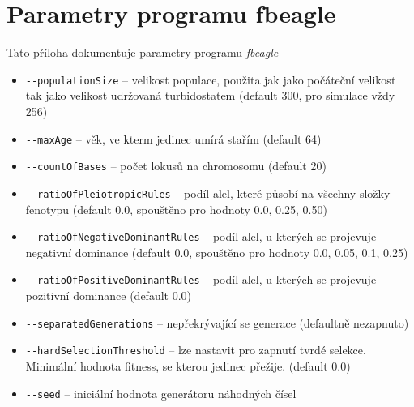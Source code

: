 \section{Parametry programu fbeagle}
\label{sec:parameters}

Tato příloha dokumentuje parametry programu \textit{fbeagle}

\begin{itemize}
  \item \texttt{-{}-populationSize} -- velikost populace, použita jak jako počáteční velikost tak jako velikost udržovaná turbidostatem (default 300, pro simulace vždy 256)
  \item \texttt{-{}-maxAge} -- věk, ve kterm jedinec umírá stařím (default 64)
  \item \texttt{-{}-countOfBases} -- počet lokusů na chromosomu (default 20)
  \item \texttt{-{}-ratioOfPleiotropicRules} -- podíl alel, které působí na všechny složky fenotypu (default 0.0, spouštěno pro hodnoty 0.0, 0.25, 0.50)
  \item \texttt{-{}-ratioOfNegativeDominantRules} -- podíl alel, u kterých se projevuje negativní dominance (default 0.0, spouštěno pro hodnoty 0.0, 0.05, 0.1, 0.25)
  \item \texttt{-{}-ratioOfPositiveDominantRules} -- podíl alel, u kterých se projevuje pozitivní dominance (default 0.0)
  \item \texttt{-{}-separatedGenerations} -- nepřekrývající se generace (defaultně nezapnuto)
  \item \texttt{-{}-hardSelectionThreshold} -- lze nastavit pro zapnutí tvrdé selekce. Minimální hodnota fitness, se kterou jedinec přežije. (default 0.0)
  \item \texttt{-{}-seed} -- iniciální hodnota generátoru náhodných čísel
\end{itemize}
